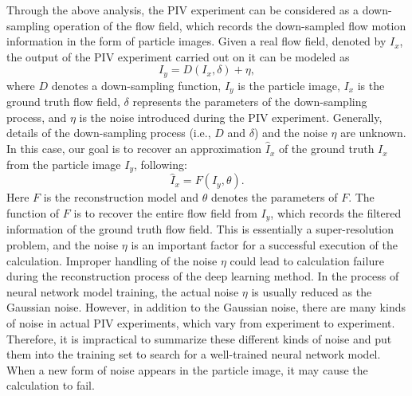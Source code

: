 \documentclass[%
 aip,
 amsmath,amssymb,
 reprint,%
]{revtex4-1}
\begin{document}
Through the above analysis, the PIV experiment can be considered as a down-sampling operation of the flow field, which records the down-sampled flow motion information in the form of particle images. 
Given a real flow field, denoted by $I_{x}$, the output of the PIV experiment carried out on it can be modeled as
\begin{equation}
I_{y}=D(I_{x},\delta)+\eta,
\label{eqn1}
\end{equation}
where $D$ denotes a down-sampling function, $I_{y}$ is the particle image, $I_{x}$ is the ground truth flow field, $\delta$ represents the parameters of the down-sampling process, and $\eta$ is the noise introduced during the PIV experiment. 
Generally, details of the down-sampling process (i.e., $D$ and $\delta$) and the noise $\eta$ are unknown. 
In this case, our goal is to recover an approximation $\hat{I}_{x}$ of the ground truth $I_{x}$ from the particle image $I_{y}$, following:
\begin{equation}
\hat{I}_{x}=F(I_{y},\theta).
\label{eqn2}
\end{equation}
Here $F$ is the reconstruction model and $\theta$ denotes the parameters of $F$. 
The function of $F$ is to recover the entire flow field from $I_{y}$, which records the filtered information of the ground truth flow field.
This is essentially a super-resolution problem, and the noise $\eta$ is an important factor for a successful execution of the calculation.
Improper handling of the noise $\eta$ could lead to calculation failure during the reconstruction process of the deep learning method.
In the process of neural network model training, the actual noise $\eta$ is usually reduced as the Gaussian noise.  
However, in addition to the Gaussian noise, there are many kinds of noise in actual PIV experiments, which vary from experiment to experiment.
Therefore, it is impractical to summarize these different kinds of noise and put them into the training set to search for a well-trained neural network model.
When a new form of noise appears in the particle image, it may cause the calculation to fail.
\end{document}
